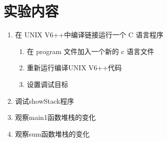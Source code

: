 \section{实验内容}
\begin{enumerate}
    \item 在 UNIX V6++中编译链接运行一个 C 语言程序
    \begin{enumerate}
        \item 在 program 文件加入一个新的 c 语言文件
        \item 重新运行编译UNIX V6++代码
        \item 设置调试目标
    \end{enumerate}
    \item 调试showStack程序
    \item 观察main1函数堆栈的变化
    \item 观察sum函数堆栈的变化
\end{enumerate}